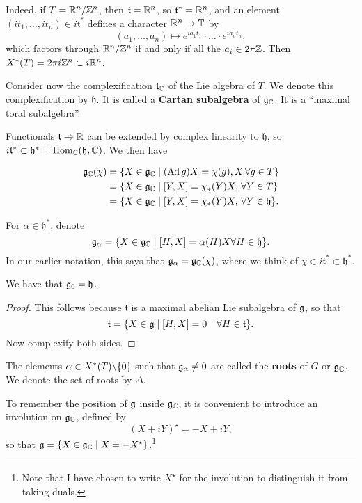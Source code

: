 \documentclass[11pt, english]{article}
\begin{document}
Indeed, if $T=\mathbb{R}^n/\mathbb{Z}^n$, then $\mathfrak t=\mathbb{R}^n$, so $\mathfrak t^\ast=\mathbb{R}^n$, and an element $(it_1,\ldots,it_n) \in i\mathfrak t^\ast$ defines a character $\mathbb{R}^n \to \mathbb T$ by 
$$
(a_1, \ldots,a_n) \mapsto e^{ia_1t_1}\cdot \ldots \cdot e^{ia_nt_n},
$$
which factors through $\mathbb{R}^n/\mathbb{Z}^n$ if and only if all the $a_i \in 2\pi \mathbb{Z}$. Then $X^\ast(T) = 2\pi i \mathbb{Z}^n \subset i \mathbb{R}^n$.

Consider now the complexification $\mathfrak t_{\mathbb{C}}$ of the Lie algebra of $T$. We denote this complexification by $\mathfrak h$. It is called a \textbf{Cartan subalgebra} of $\mathfrak g_{\mathbb{C}}$. It is a ``maximal toral subalgebra''.

Functionals $\mathfrak t \to \mathbb{R}$ can be extended by complex linearity to $\mathfrak h$, so $i \mathfrak t^\ast \subset \mathfrak h^\ast = \operatorname{Hom}_{\mathbb{C}}(\mathfrak h, \mathbb{C})$. We then have

\begin{align*}
  \mathfrak g_{\mathbb{C}}(\chi) &= \{ X \in \mathfrak g_{\mathbb{C}} \mid (\operatorname{Ad} g)X = \chi(g), X\, \forall g \in T \} \\
&= \{ X \in \mathfrak g_{\mathbb{C}} \mid [Y,X] = \chi_\ast(Y)X, \,\forall Y \in T \} \\
&= \{ X \in \mathfrak g_{\mathbb{C}} \mid [Y,X] = \chi_\ast(Y)X, \, \forall Y \in \mathfrak h \}.
\end{align*}

For $\alpha \in \mathfrak h^\ast$, denote
$$
\mathfrak g_\alpha = \{ X \in \mathfrak g_{\mathbb{C}} \mid [H,X] = \alpha(H)X \forall H \in \mathfrak h \}.
$$
In our earlier notation, this says that $\mathfrak g_{\alpha} = \mathfrak g_{\mathbb{C}}(\chi)$, where we think of $\chi \in i \mathfrak t^\ast \subset \mathfrak h^\ast$.

\begin{lemma}
We have that $\mathfrak g_0 = \mathfrak h$.
\end{lemma}
\begin{proof}
 This follows because $\mathfrak t$ is a maximal abelian Lie subalgebra of $\mathfrak g$, so that
$$
\mathfrak t = \{ X \in \mathfrak g \mid [H,X] = 0 \quad \forall H \in \mathfrak t \}.
$$
Now complexify both sides.
\end{proof}

The elements $\alpha \in X^\ast(T) \backslash \{ 0 \}$ such that $\mathfrak g_\alpha \neq 0$ are called the \textbf{roots} of $G$ or $\mathfrak g_{\mathbb{C}}$. We denote the set of roots by $\Delta$. 

To remember the position of $\mathfrak g$ inside $\mathfrak g_{\mathbb{C}}$, it is convenient to introduce an involution on $\mathfrak g_{\mathbb{C}}$, defined by
$$
(X+iY)^\star = -X + iY,
$$
so that $\mathfrak g = \{ X \in \mathfrak g_{\mathbb{C}} \mid X = -X^\star \}$.\footnote{Note that I have chosen to write $X^\star$ for the involution to distinguish it from taking duals.}
\end{document}
